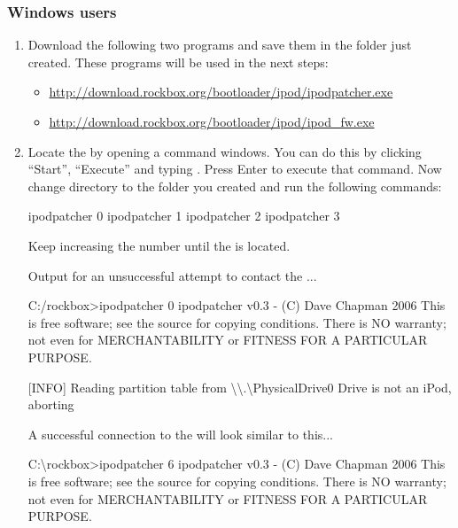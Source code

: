 \subsubsection{Windows users}
\begin{enumerate}
  \item Download the following two programs and save them in the folder just
    created. These programs will be used in the next steps:
    \begin{itemize}
      \item \url{http://download.rockbox.org/bootloader/ipod/ipodpatcher.exe}
      \item \url{http://download.rockbox.org/bootloader/ipod/ipod_fw.exe}
    \end{itemize}
  \item Locate the \dap{} by opening a command windows. You can do this by
    clicking ``Start'', ``Execute'' and typing . Press Enter to
    execute that command. Now change directory to the
    folder you created and run the following commands:
    \begin{code}
    ipodpatcher 0
    ipodpatcher 1
    ipodpatcher 2
    ipodpatcher 3
    \end{code}
    Keep increasing the number until the \dap{} is located. 

    Output for an unsuccessful attempt to contact the \dap{}...
    \begin{code}
    C:/rockbox>ipodpatcher 0
    ipodpatcher v0.3 - (C) Dave Chapman 2006
    This is free software; see the source for copying conditions.  There is NO
    warranty; not even for MERCHANTABILITY or FITNESS FOR A PARTICULAR PURPOSE.

    [INFO] Reading partition table from \textbackslash\textbackslash{}.\textbackslash{}PhysicalDrive0
    Drive is not an iPod, aborting
    \end{code}
    
    A successful connection to the \dap{} will look similar to this...
    \begin{code}
    C:\textbackslash{}rockbox>ipodpatcher 6
    ipodpatcher v0.3 - (C) Dave Chapman 2006
    This is free software; see the source for copying conditions.  There is NO
    warranty; not even for MERCHANTABILITY or FITNESS FOR A PARTICULAR PURPOSE.


\end{code}
\end{enumerate}
